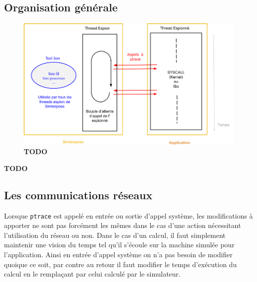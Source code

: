 \subsection{Organisation générale}
\begin{figure}[H]
  \centering \includegraphics[scale=0.5]{Pictures/png/Simterpose_orga_code_v3}
  \caption{{\color{red} \textbf{TODO}}}
  \label{Organisation_Simterpose}
\end{figure}

{\color{red} \textbf{TODO}}

\subsection{Les communications réseaux}

Lorsque \texttt{ptrace} est appelé en entrée ou sortie d'appel système, les modifications
à apporter ne sont pas forcément les mêmes dans le cas d'une action nécessitant
l'utilisation du réseau ou non. Dans le cas d'un calcul, il faut simplement
maintenir une vision du temps tel qu'il s'écoule sur la machine simulée pour
l'application. Ainsi en entrée d'appel système on n'a pas besoin de modifier
quoique ce soit, par contre au retour il faut modifier le temps d'exécution du
calcul en le remplaçant par celui calculé par le simulateur.

